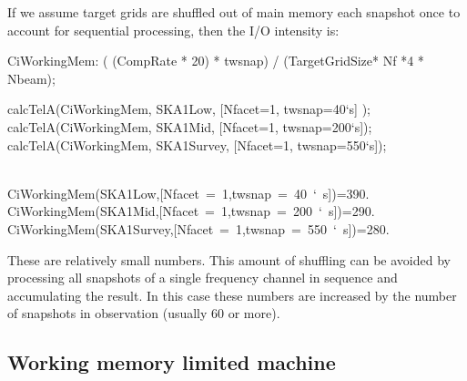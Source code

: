 \documentclass[useAMS,usenatbib,referee]{article}
\begin{document}
If we assume target grids are shuffled out of main memory each
snapshot once to account for sequential processing, then the I/O
intensity is:
\begin{maxima}[]

CiWorkingMem: ( (CompRate * 20)  * twsnap) / (TargetGridSize* Nf *4 * Nbeam);

calcTelA(CiWorkingMem, SKA1Low, [Nfacet=1, twsnap=40`s] );
calcTelA(CiWorkingMem, SKA1Mid, [Nfacet=1, twsnap=200`s]);
calcTelA(CiWorkingMem, SKA1Survey, [Nfacet=1, twsnap=550`s]);


\maximaoutput*
{} \\
\m  \mbox{{}CiWorkingMem(SKA1Low,[Nfacet = 1,twsnap = 40 ` s]){}}=390. \\
\m  \mbox{{}CiWorkingMem(SKA1Mid,[Nfacet = 1,twsnap = 200 ` s]){}}=290. \\
\m  \mbox{{}CiWorkingMem(SKA1Survey,[Nfacet = 1,twsnap = 550 ` s]){}}=280. \\
\end{maxima}

These are relatively small numbers. This amount of shuffling can be
avoided by processing all snapshots of a single frequency channel in
sequence and accumulating the result. In this case these numbers are
increased by the number of snapshots in observation (usually 60 or
more).


\subsection{Working memory limited machine}
\end{document}
